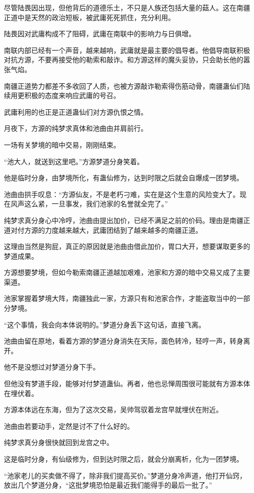 \begin{this_body}
尽管陆畏因出现，但他背后的道德乐土，不只是人族还包括大量的菇人。这在南疆正道中是天然的政治短板，被武庸死死抓住，充分利用。

陆畏因对武庸构成不了阻碍，武庸在南联中的影响力与日俱增。

南联内部已经有一个声音，越来越响，武庸就是最主要的倡导者。他倡导南联积极对抗方源，不要再接受他的勒索和敲诈。和方源这样的魔头妥协，只会助长他的嚣张气焰。

南疆正道势力都差不多收回了人质，也被方源敲诈勒索得伤筋动骨，南疆蛊仙们陆续用更积极的态度来响应武庸的号召。

武庸利用的也正是正道蛊仙们对方源仇恨之情。

月夜下，方源的纯梦求真体和池曲由并肩前行。

一场有关梦境的暗中交易，刚刚结束。

“池大人，就送到这里吧。”方源梦道分身笑着。

他是临时分身，由梦境所化，有蛊仙修为，达到时限之后就会自爆成一团梦境。

池曲由拱手叹息：“方源仙友，不是老朽刁难，实在是这个生意的风险变大了。现在风声这么紧，一旦事发，我们池家的名誉就全完了。”

纯梦求真分身心中冷哼，池曲由提出加价，已经不满足之前的价码。理由是南疆正道对付方源的力度越来越大，武庸团结到了越来越多的南疆正道。

这理由当然是狗屁，真正的原因就是池曲由借此加价，胃口大开，想要谋取更多的梦道成果。

方源想要梦境，但如今勒索南疆正道越加艰难，池家和方源的暗中交易又成了主要渠道。

池家掌握着梦境大阵，南疆独此一家，方源只有和池家合作，才能盗取当中的一部分梦境。

“这个事情，我会向本体说明的。”梦道分身丢下这句话，直接飞离。

池曲由留在原地，看着方源的梦道分身消失在天际，面色转冷，轻哼一声，转身离开。

他不是没想过对梦道分身下手。

但他没有梦道手段，能够对付梦道蛊仙。再者，他也忌惮周围很可能就有方源本体在埋伏着。

方源本体远在东海，但为了这次交易，吴帅驾驭着龙宫早就埋伏在附近。

池曲由若要动手，定然是讨不了什么好的。

纯梦求真分身很快就回到龙宫之中。

这是临时分身，有仙级修为，但到达时限之后，就会分崩离析，化为一团梦境。

“池家老儿的买卖做不得了，除非我们提高买价。”梦道分身冷声道，他打开仙窍，放出几个梦道分身，“这批梦境恐怕是最近我们能得手的最后一批了。”


\end{this_body}
